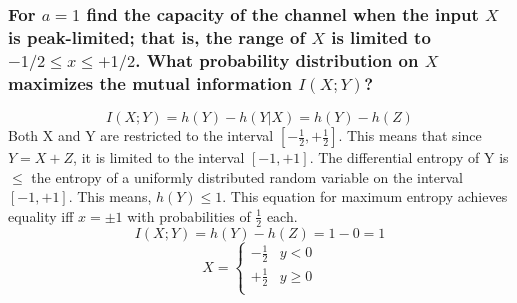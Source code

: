 \documentclass[11pt, oneside]{book}   	%
\begin{document}
\subsubsection{For $a=1$ find the capacity of the channel when the input $X$ is peak-limited; that is, the range of $X$ is limited to $-1/2 \leq x \leq +1/2$.  What probability distribution on $X$ maximizes the mutual information $I(X;Y)$?}

$$I(X;Y) = h(Y) - h(Y|X) = h(Y) - h(Z)$$
Both X and Y are restricted to the interval $[-\frac{1}{2}, +\frac{1}{2}]$.  This means that since $Y = X + Z$, it is limited to the interval $[-1, +1]$.  The differential entropy of Y is $\leq$ the entropy of a uniformly distributed random variable on the interval $[-1, +1]$.  This means, $h(Y) \leq 1$.  This equation for maximum entropy achieves equality iff $x = \pm 1$ with probabilities of $\frac{1}{2}$ each.
$$I(X;Y) = h(Y) - h(Z) = 1 - 0 = 1$$
\[ \hat{X} =
  \begin{cases} 
	-\frac{1}{2} & y < 0 \\
	+\frac{1}{2} & y \geq 0 \\
   \end{cases}
\]
\end{document}
